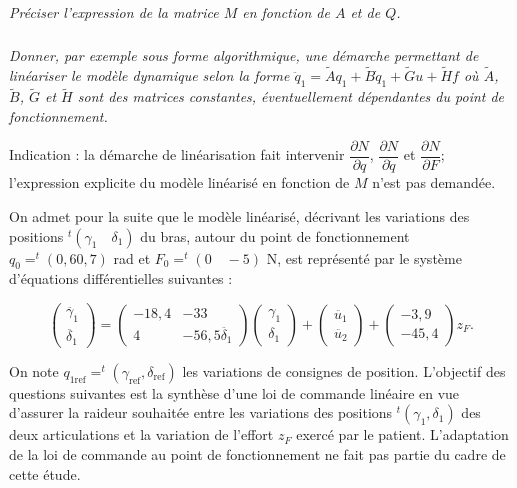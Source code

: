 \begin{multicols}{2}
\subparagraph{}
\textit{Préciser l’expression de la matrice $M$ en fonction de $A$ et de $Q$.}
\ifprof
\begin{corrige}
\end{corrige}
\else
\fi



\subparagraph{}
\textit{Donner, par exemple sous forme algorithmique, une démarche permettant de linéariser le modèle dynamique selon la forme $\ddot{q}_1 = \tilde{A}q_1+\tilde{B}\dot{q}_1+\tilde{G}u+\tilde{H}f$ où $\tilde{A}$, $\tilde{B}$, $\tilde{G}$ et $\tilde{H}$ sont des matrices constantes, éventuellement
dépendantes du point de fonctionnement.}
\ifprof
\begin{corrige}
\end{corrige}
\else
\fi


Indication : la démarche de linéarisation fait intervenir $\dfrac{\partial N}{\partial q}$, $\dfrac{\partial N}{\partial \dot{q}}$ et $\dfrac{\partial N}{\partial F}$; l’expression explicite du modèle linéarisé
en fonction de $M$ n’est pas demandée.


On admet pour la suite que le modèle linéarisé, décrivant les variations des positions $ ^t\left(\gamma_1 \quad \delta_1 \right)$ du bras, autour du point de fonctionnement $q_0 = ^t\left(0,6 0,7\right)$ rad et $F_0 = ^t\left(0 \quad -5\right)$ N, est représenté par le système d’équations différentielles suivantes :


$$
\begin{pmatrix}
\ddot{\gamma_1} \\
\ddot{\delta_1}
\end{pmatrix}
=
\begin{pmatrix}
-18,4 & -33 \\
4 & -56,5
\ddot{\delta_1}
\end{pmatrix}
\begin{pmatrix}
{\gamma_1} \\
{\delta_1}
\end{pmatrix}
+
\begin{pmatrix}
\ddot{u_1} \\
\ddot{u_2}
\end{pmatrix}
+
\begin{pmatrix}
-3,9 \\
-45,4
\end{pmatrix}
z_F.
$$

On note $q_{1\text{ref}} = ^t\left(\gamma_{\text{ref}}, \delta_{\text{ref}} \right)$ les variations de consignes de position. L’objectif des questions suivantes est la
synthèse d’une loi de commande linéaire en vue d’assurer la raideur souhaitée entre les variations des positions  $ ^t\left(\gamma_{1}, \delta_{1} \right)$ des deux articulations et la variation de l’effort $z_F$ exercé par le patient. L’adaptation de la loi de
commande au point de fonctionnement ne fait pas partie du cadre de cette étude.





\end{multicols}
